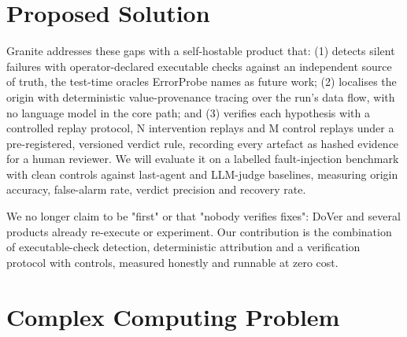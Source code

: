 \documentclass{fast-nuces-bs}
\begin{document}
\section{Proposed Solution}

Granite addresses these gaps with a self-hostable product that: (1) detects silent failures with operator-declared executable checks against an independent source of truth, the test-time oracles ErrorProbe names as future work; (2) localises the origin with deterministic value-provenance tracing over the run's data flow, with no language model in the core path; and (3) verifies each hypothesis with a controlled replay protocol, N intervention replays and M control replays under a pre-registered, versioned verdict rule, recording every artefact as hashed evidence for a human reviewer. We will evaluate it on a labelled fault-injection benchmark with clean controls against last-agent and LLM-judge baselines, measuring origin accuracy, false-alarm rate, verdict precision and recovery rate.

We no longer claim to be "first" or that "nobody verifies fixes": DoVer and several products already re-execute or experiment. Our contribution is the combination of executable-check detection, deterministic attribution and a verification protocol with controls, measured honestly and runnable at zero cost.

\section{Complex Computing Problem}
\end{document}
